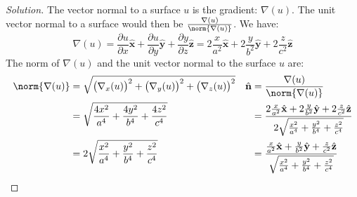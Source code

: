 \documentclass[crop=false,class=article,oneside]{standalone}
\begin{document}
        \begin{proof}[Solution]
            The vector normal to a surface $u$
            is the gradient: $\nabla(u)$.
            The unit vector normal to a surface would then be
            $\frac{\nabla(u)}{\norm{\nabla(u)}}$. We have:
            \begin{equation*}
                \nabla(u)
                =\frac{\partial u}{\partial x}\hat{\mathbf{x}}
                +\frac{\partial u}{\partial y}\hat{\mathbf{y}}
                +\frac{\partial y}{\partial z}\hat{\mathbf{z}}
                =2\frac{x}{a^2}\hat{\mathbf{x}}
                +2\frac{y}{b^2}\hat{\mathbf{y}}
                +2\frac{z}{c^2}\hat{\mathbf{z}}
            \end{equation*}
            The norm of $\nabla(u)$ and the
            unit vector normal to the surface $u$ are:
            \begin{align*}
                \norm{\nabla(u)}
                &=
                \sqrt{\big(\nabla_{x}(u)\big)^{2}
                +\big(\nabla_{y}(u)\big)^{2}
                +\big(\nabla_{z}(u)\big)^{2}}
                &\hat{\mathbf{n}}
                &=\frac{\nabla(u)}{\norm{\nabla(u)}}\\
                &=
                \sqrt{\frac{4x^{2}}{a^{4}}
                +\frac{4y^{2}}{b^{4}}+\frac{4z^{2}}{c^{4}}}
                &
                &=\frac{2\frac{x}{a^{2}}\hat{\mathbf{x}}
                        +2\frac{y}{b^{2}}\hat{\mathbf{y}}
                        +2\frac{z}{c^{2}}\hat{\mathbf{z}}
                       }{
                            2\sqrt{\frac{x^{2}}{a^{4}}
                            +\frac{y^{2}}{b^{4}}
                            +\frac{z^{2}}{c^{4}}
                        }
                    }\\
                &=
                2\sqrt{\frac{x^{2}}{a^{4}}
                +\frac{y^{2}}{b^{4}}
                +\frac{z^{2}}{c^{4}}}
                &
                &=
                \frac{
                      \frac{x}{a^{2}}\hat{\mathbf{x}}
                      +\frac{y}{b^{2}}\hat{\mathbf{y}}
                      +\frac{z}{c^{2}}\hat{\mathbf{z}}}
                     {
                        \sqrt{
                            \frac{x^{2}}{a^{4}}
                            +\frac{y^{2}}{b^{4}}
                            +\frac{z^{2}}{c^{4}}
                        }
                    }
            \end{align*}
        \end{proof}
\end{document}
